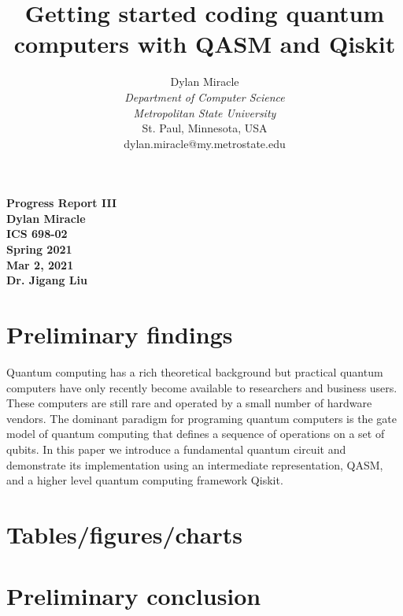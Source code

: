 \documentclass{article}
\begin{document}
\begin{titlepage}
    \begin{center}
        \vspace{4cm}
        \Huge
        \textbf{
            Progress Report III \\
            Dylan Miracle \\
            ICS 698-02 \\
            Spring 2021 \\
            Mar 2, 2021 \\
            Dr. Jigang Liu
        }
    \end{center}
\end{titlepage}
\title{Getting started coding quantum computers with QASM and Qiskit}

\author{Dylan Miracle\\
\textit{Department of Computer Science} \\
\textit{Metropolitan State University}\\
St. Paul, Minnesota, USA \\
dylan.miracle@my.metrostate.edu
}

\maketitle

\tableofcontents

\section{Preliminary findings}
Quantum computing has a rich theoretical background but practical quantum computers have only recently become available to researchers and business users. These computers are still rare and operated by a small number of hardware vendors. The dominant paradigm for programing quantum computers is the gate model of quantum computing that defines a sequence of operations on a set of qubits. In this paper we introduce a fundamental quantum circuit and demonstrate its implementation using an intermediate representation, QASM, and a higher level quantum computing framework Qiskit.

\section{Tables/figures/charts}

\section{Preliminary conclusion}
\end{document}
